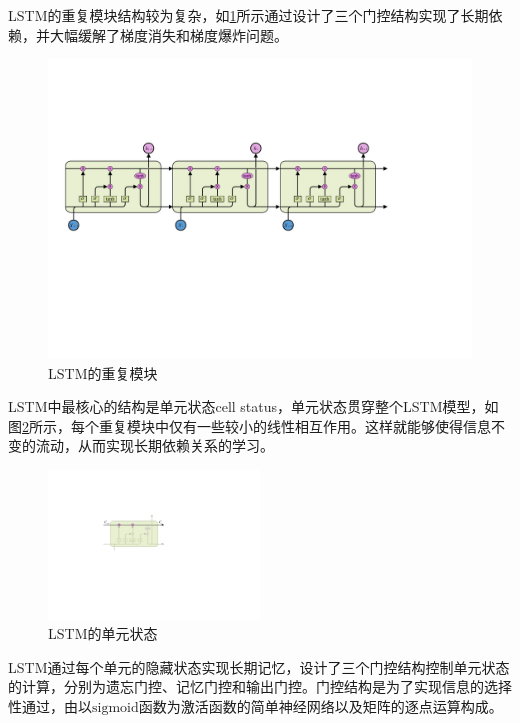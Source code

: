 \documentclass[master]{thesis-uestc}
\begin{document}
LSTM的重复模块结构较为复杂，如\ref{Figure.2.4}所示通过设计了三个门控结构实现了长期依赖，并大幅缓解了梯度消失和梯度爆炸问题。
\begin{figure}[!ht]
\centering 
\includegraphics[width=1.0\textwidth]{./pic/LSTM1.pdf}
\caption{LSTM的重复模块}
\label{Figure.2.4}
\end{figure}

LSTM中最核心的结构是单元状态cell status，单元状态贯穿整个LSTM模型，如图\ref{Figure.2.5}所示，每个重复模块中仅有一些较小的线性相互作用。这样就能够使得信息不变的流动，从而实现长期依赖关系的学习。
\begin{figure}[!ht]
\centering 
\includegraphics[width=0.5\textwidth]{./pic/LSTM-cell.pdf}
\caption{LSTM的单元状态}
\label{Figure.2.5}
\end{figure}

LSTM通过每个单元的隐藏状态实现长期记忆，设计了三个门控结构控制单元状态的计算，分别为遗忘门控、记忆门控和输出门控。门控结构是为了实现信息的选择性通过，由以$\mathrm{sigmoid}$函数为激活函数的简单神经网络以及矩阵的逐点运算构成。
\end{document}
